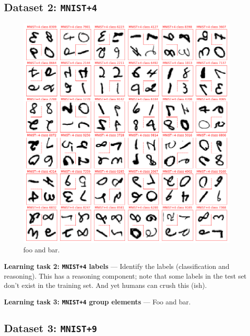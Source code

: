 \documentclass{article}
\renewcommand{\paragraph}[1]{\par\medskip\noindent\textbf{#1} ---}
\begin{document}
\subsection*{Dataset 2: \texttt{MNIST+4}}

\begin{figure}[t!]
\includegraphics[width=\textwidth]{../notebooks/MNIST+4.png}
\caption{foo and bar.\label{fig:4}}
\end{figure}

\paragraph{Learning task 2: \texttt{MNIST+4} labels}
Identify the labels (classification and reasoning).
This has a reasoning component; note that some labels in the test set don't exist in the training set.
And yet humans can crush this (ish).

\paragraph{Learning task 3: \texttt{MNIST+4} group elements}
Foo and bar.

\subsection*{Dataset 3: \texttt{MNIST+9}}
\end{document}
